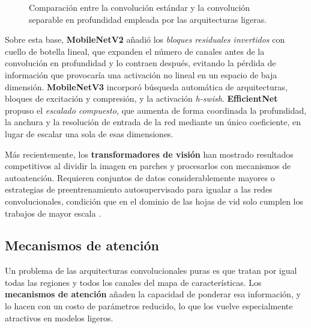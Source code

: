 \begin{figure}[htbp]
\caption{Comparación entre la convolución estándar y la convolución
separable en profundidad empleada por las arquitecturas ligeras.}
\label{fig:separable}
\end{figure}

Sobre esta base, \textbf{MobileNetV2} \citep{sandler2018} añadió los
\textit{bloques residuales invertidos} con cuello de botella lineal, que
expanden el número de canales antes de la convolución en profundidad y lo
contraen después, evitando la pérdida de información que provocaría una
activación no lineal en un espacio de baja dimensión.
\textbf{MobileNetV3} \citep{howard2019} incorporó búsqueda automática de
arquitecturas, bloques de excitación y compresión, y la activación
\textit{h-swish}. \textbf{EfficientNet} \citep{tan2019} propuso el
\textit{escalado compuesto}, que aumenta de forma coordinada la profundidad,
la anchura y la resolución de entrada de la red mediante un único
coeficiente, en lugar de escalar una sola de esas dimensiones.

Más recientemente, los \textbf{transformadores de visión}
\citep{dosovitskiy2021} han mostrado resultados competitivos al dividir la
imagen en parches y procesarlos con mecanismos de autoatención. Requieren
conjuntos de datos considerablemente mayores o estrategias de
preentrenamiento autosupervisado para igualar a las redes convolucionales,
condición que en el dominio de las hojas de vid solo cumplen los trabajos de
mayor escala \citep{carneiro2024mae}.

\subsection{Mecanismos de atención}

Un problema de las arquitecturas convolucionales puras es que tratan por
igual todas las regiones y todos los canales del mapa de características.
Los \textbf{mecanismos de atención} añaden la capacidad de ponderar esa
información, y lo hacen con un costo de parámetros reducido, lo que los
vuelve especialmente atractivos en modelos ligeros.

